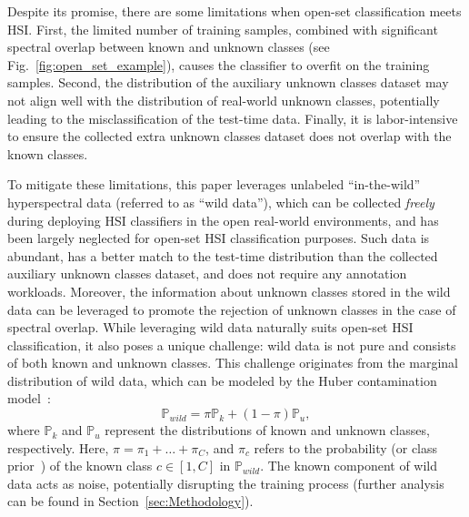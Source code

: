 Despite its promise, there are some limitations when open-set classification meets HSI. First, the limited number of training samples, combined with significant spectral overlap between known and unknown classes (see Fig.~\ref{fig:open_set_example}), causes the classifier to overfit on the training samples. Second, the distribution of the auxiliary unknown classes dataset may not align well with the distribution of real-world unknown classes, potentially leading to the misclassification of the test-time data. Finally, it is labor-intensive to ensure the collected extra unknown classes dataset does not overlap with the known classes.

To mitigate these limitations, this paper leverages unlabeled ``in-the-wild'' hyperspectral data (referred to as ``wild data''), which can be collected \textit{freely} during deploying HSI classifiers in the open real-world environments, and has been largely neglected for open-set HSI classification purposes. Such data is abundant, has a better match to the test-time distribution than the collected auxiliary unknown classes dataset, and does not require any annotation workloads. Moreover, the information about unknown classes stored in the wild data can be leveraged to promote the rejection of unknown classes in the case of spectral overlap. While leveraging wild data naturally suits open-set HSI classification, it also poses a unique challenge: wild data is not pure and consists of both known and unknown classes. This challenge originates from the marginal distribution of wild data, which can be modeled by the Huber contamination model~\cite{Huber}:
\begin{equation}
    \mathbb{P}_{wild}=\pi\mathbb{P}_{k}+(1-\pi)\mathbb{P}_{u},
    \label{eq:huber_contamination_model}
\end{equation}
where $\mathbb{P}_{k}$ and $\mathbb{P}_{u}$ represent the distributions of known and unknown classes, respectively. Here, $\pi=\pi_{1}+\dots+\pi_{C}$, and $\pi_{c}$ refers to the probability (or class prior~\cite{DistPU}) of the known class $c \in [1,C]$ in $\mathbb{P}_{wild}$.
The known component of wild data acts as noise, potentially disrupting the training process (further analysis can be found in Section~\ref{sec:Methodology}). 

\begin{center}
\end{center}

